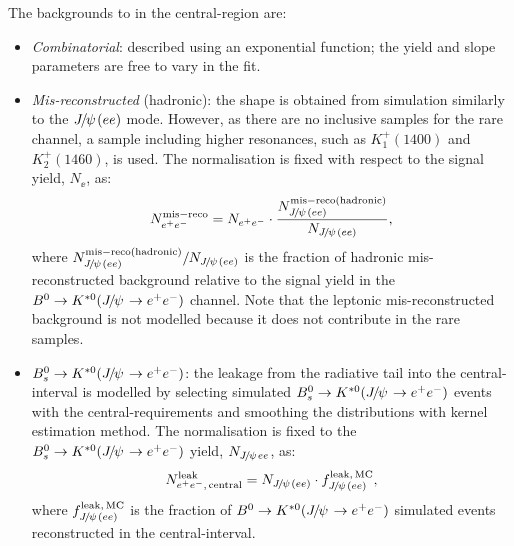 The backgrounds to \BdToKstee in the central-\qsq region are:
%
\begin{itemize}

\item \textit{Combinatorial}: described using an exponential function; the yield and slope parameters are free to vary in the fit.

\item \textit{Mis-reconstructed} (hadronic): the shape is obtained from simulation similarly to the $\jpsi(ee)$ mode. 
However, as there are no inclusive samples for the rare channel, a sample including higher \Kstarz resonances, 
such as $K_1^+(1400)$ and $K_2^+(1460)$, is used. The normalisation is fixed with respect to the signal yield, $N_{\ee}$, as:
%
$$N_{\ee}^{\rm mis-reco} = N_{\ee} \cdot \frac{N_{\jpsi(ee)}^{\rm mis-reco (hadronic)}}{N_{\jpsi(ee)}},$$
%
where $N_{\jpsi(ee)}^{\rm mis-reco (hadronic)}/N_{\jpsi(ee)}$ is the fraction of hadronic mis-reconstructed background relative
to the signal yield in the $\Bd\to\Kstarz(\jpsi\to\ee)$ channel. Note that the leptonic mis-reconstructed background is not modelled
because it does not contribute in the rare samples.

\item $\Bs\to\Kstarz(\jpsi\to\ee)$: the leakage from the \jpsi radiative tail into the central-\qsq interval is modelled by selecting 
simulated $\Bs\to\Kstarz(\jpsi\to\ee)$ events with the central-\qsq requirements and smoothing the distributions
with kernel estimation method. The normalisation is fixed to the $\Bs\to\Kstarz(\jpsi\to\ee)$ yield, 
$N_{\jpsi ee}$, as:
%
$$N_{\ee, \, {\rm central}}^{\rm leak} = N_{\jpsi(ee)} \cdot f_{\jpsi(ee)}^{\rm leak, \,MC},$$
%
where $f_{\jpsi(ee)}^{\rm leak, \,MC}$ is the fraction of $\Bd\to\Kstarz(\jpsi\to\ee)$ simulated events reconstructed
in the central-\qsq interval.

\end{itemize}

